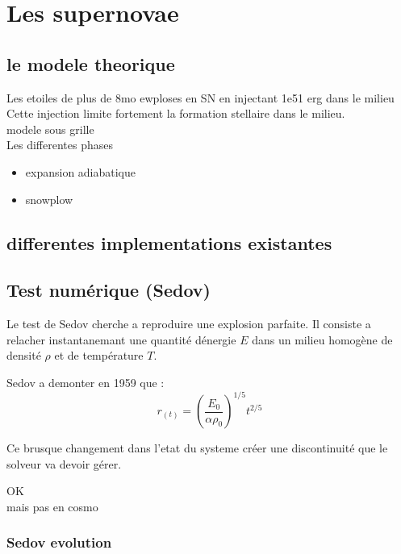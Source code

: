 \section{Les supernovae}

\subsection{le modele theorique}
Les etoiles de plus de 8mo ewploses en SN en injectant 1e51 erg dans le milieu\\
Cette injection limite fortement la formation stellaire dans le milieu.\\
modele sous grille\\



Les differentes phases
\begin{itemize}
\item expansion adiabatique
\item snowplow
\end{itemize}

\subsection{ differentes implementations existantes}


\subsection{Test numérique (Sedov)}

Le test de Sedov cherche a reproduire une explosion parfaite.
Il consiste a relacher instantanemant une quantité dénergie $E$ dans un milieu homogène de densité $\rho$ et de température $T$.

Sedov a demonter en 1959 que :
\begin{equation}
r_{(t)}=\left( \frac{E_0}{\alpha \rho_0 }\right)^{1/5} t^{2/5}
\end{equation}



Ce brusque changement dans l'etat du systeme créer une discontinuité que le solveur va devoir gérer.



OK\\
mais pas en cosmo




\subsubsection{Sedov evolution}

